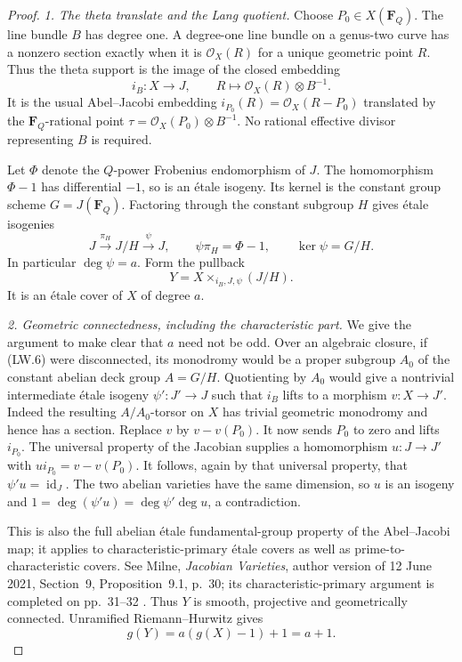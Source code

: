 \begin{proof}
\emph{1. The theta translate and the Lang quotient.}
Choose $P_0\in X(\mathbf F_Q)$.  The line bundle $B$ has degree one.
A degree-one line bundle on a genus-two curve has a nonzero section
exactly when it is $\mathcal O_X(R)$ for a unique geometric point $R$.
Thus the theta support is the image of the closed embedding
\[
 i_B:X\longrightarrow J,\qquad
 R\longmapsto\mathcal O_X(R)\otimes B^{-1}.
\]
It is the usual Abel--Jacobi embedding
$i_{P_0}(R)=\mathcal O_X(R-P_0)$ translated by the
$\mathbf F_Q$-rational point
$\tau=\mathcal O_X(P_0)\otimes B^{-1}$.
No rational effective divisor representing $B$ is required.

Let $\Phi$ denote the $Q$-power Frobenius endomorphism of $J$.
The homomorphism $\Phi-1$ has differential $-1$, so is an
\'etale isogeny.  Its kernel is the constant group scheme
$G=J(\mathbf F_Q)$.  Factoring through the constant subgroup $H$
gives \'etale isogenies
\[
  J\xrightarrow{\pi_H} J/H\xrightarrow{\psi}J,
  \qquad \psi\pi_H=\Phi-1,
  \qquad \ker\psi=G/H.
 \tag{LW.5}
\]
In particular $\deg\psi=a$.  Form the pullback
\[
                  Y=X\times_{i_B,J,\psi}(J/H).
 \tag{LW.6}
\]
It is an \'etale cover of $X$ of degree $a$.

\emph{2. Geometric connectedness, including the characteristic part.}
We give the argument to make clear that $a$ need not be odd.
Over an algebraic closure, if (LW.6) were disconnected, its
monodromy would be a proper subgroup $A_0$ of the constant abelian
deck group $A=G/H$.  Quotienting by $A_0$ would give a nontrivial
intermediate \'etale isogeny
$\psi':J'\to J$ such that $i_B$ lifts to a morphism $v:X\to J'$.
Indeed the resulting $A/A_0$-torsor on $X$ has trivial geometric
monodromy and hence has a section.
Replace $v$ by $v-v(P_0)$.  It now sends $P_0$ to zero and lifts
$i_{P_0}$.  The universal property of the Jacobian supplies a
homomorphism $u:J\to J'$ with
$u i_{P_0}=v-v(P_0)$.  It follows, again by that universal property,
that $\psi'u=\operatorname{id}_J$.  The two abelian varieties have
the same dimension, so $u$ is an isogeny and
$1=\deg(\psi'u)=\deg\psi'\deg u$, a contradiction.

This is also the full abelian \'etale fundamental-group property
of the Abel--Jacobi map; it applies to characteristic-primary
\'etale covers as well as prime-to-characteristic covers.
See Milne, \emph{Jacobian Varieties}, author version of
12 June 2021, Section~9, Proposition~9.1, p.~30;
its characteristic-primary argument is completed on pp.~31--32 \cite{MilneJV}.
Thus $Y$ is smooth, projective and geometrically connected.
Unramified Riemann--Hurwitz gives
\[
                         g(Y)=a(g(X)-1)+1=a+1.
 \tag{LW.7}
\]


\end{proof}
